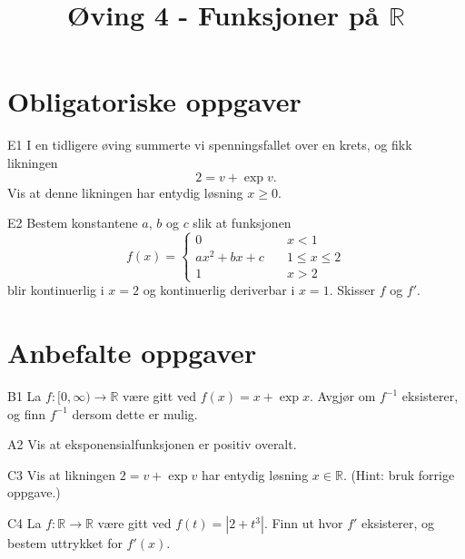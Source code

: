 \documentclass[a4paper,norsk,11pt]{interaktiv}
\title{Øving 4 - Funksjoner på $\mathbb{R}$}
\begin{document}

\maketitle



\section*{Obligatoriske oppgaver}


\begin{oppgave}{E1}
I en tidligere øving summerte vi spenningsfallet over en krets, 
og fikk likningen 
\[
2=v+\exp{v}.
\]
Vis at denne likningen har entydig løsning $x \geq 0$.
\end{oppgave}

\begin{oppgave}{E2}
Bestem konstantene $a$, $b$ og $c$ slik at funksjonen
\[
f(x)=
\begin{cases}
0 \quad &x<1 \\
ax^2+bx+c \quad &1\leq x \leq 2\\
1 \quad &x  >2
\end{cases}
\]
blir kontinuerlig i $x=2$ og kontinuerlig deriverbar i $x=1$.
Skisser $f$ og $f'$.
\end{oppgave}




\section*{Anbefalte oppgaver}



\begin{oppgave}{B1}
La $f: [0,\infty)\to \mathbb{R}$ være gitt ved $f(x)=x+\exp{x}$. 
Avgjør om $f^{-1}$ eksisterer, 
og finn $f^{-1}$ dersom dette er mulig.
\end{oppgave}

\begin{oppgave}{A2}
Vis at eksponensialfunksjonen er positiv overalt.
\end{oppgave}

\begin{oppgave}{C3}
Vis at likningen $2=v+\exp{v}$ har entydig løsning $x \in \mathbb{R}$.
(Hint: bruk forrige oppgave.)
\end{oppgave}

\begin{oppgave}{C4}
La $f: \mathbb{R} \to \mathbb{R}$ være gitt ved $f(t)=|2+t^3|$.  Finn ut hvor $f'$ eksisterer, og bestem uttrykket for $f'(x)$. 
\end{oppgave}
\end{document}

